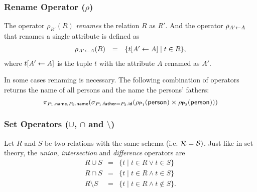 

\subsubsection[Rename Operator]{Rename Operator ($\rho$)}

The operator $\rho_{R'}(R)$ \emph{renames} the relation $R$ as $R'$. And the operator $\rho_{A' \leftarrow A}$ that renames a single attribute is defined as
\[ \begin{array}{rcl}
\rho_{A' \leftarrow A}(R) & = & \{t[A' \leftarrow A] \mid t \in R\},
\end{array} \]
where $t[A' \leftarrow A]$ is the tuple $t$ with the attribute $A$ renamed as $A'$.

\begin{example} In some cases renaming is necessary. The following combination of operators returns the name of all persons and the name the persons' fathers:
\[\pi_{P_1.\mathsf{name},P_2.\mathsf{name}}(\sigma_{P_1.\mathsf{father}=P_2.\mathsf{id}}(\rho_{\mathsf{P_1}}(\mathsf{person}) \times \rho_{\mathsf{P_2}}(\mathsf{person})))\]
\end{example}




\subsubsection[Set Operators]{Set Operators ($\cup$, $\cap$ and $\setminus$)}

Let $R$ and $S$ be two relations with the same schema (i.e. $\mathcal{R} = \mathcal{S})$. Just like in set theory, the \emph{union}, \emph{intersection} and \emph{difference} operators are
\[ \begin{array}{rcl}
R \cup S & = & \{ t \mid t \in R \vee t \in S \} \\[0.5em]
R \cap S & = & \{ t \mid t \in R \wedge t \in S \} \\[0.5em]
R \setminus S & = & \{ t \mid t \in R \wedge t \notin S \}.
\end{array} \]



